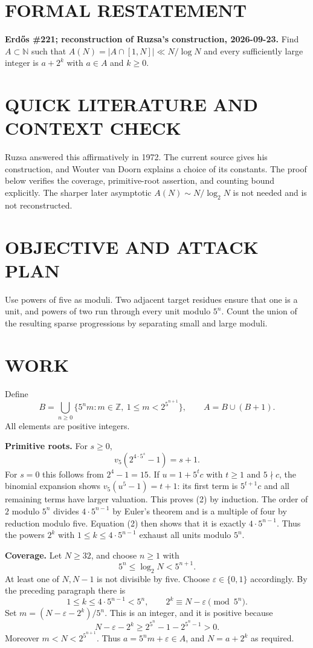 \section{FORMAL RESTATEMENT}
\textbf{Erd\H{o}s \#221; reconstruction of Ruzsa's construction, 2026-09-23.}
Find $A\subset\mathbb N$ such that $A(N)=|A\cap[1,N]|\ll N/\log N$ and every sufficiently large integer is $a+2^k$ with $a\in A$ and $k\geq0$.

\section{QUICK LITERATURE AND CONTEXT CHECK}
Ruzsa answered this affirmatively in 1972. The current source gives his construction, and Wouter van Doorn explains a choice of its constants. The proof below verifies the coverage, primitive-root assertion, and counting bound explicitly. The sharper later asymptotic $A(N)\sim N/\log_2N$ is not needed and is not reconstructed.

\section{OBJECTIVE AND ATTACK PLAN}
Use powers of five as moduli. Two adjacent target residues ensure that one is a unit, and powers of two run through every unit modulo $5^n$. Count the union of the resulting sparse progressions by separating small and large moduli.

\section{WORK}
Define
\[
B=\bigcup_{n\geq0}\{5^n m:m\in\mathbb Z,\ 1\leq m<2^{5^{n+1}}\},
\qquad A=B\cup(B+1).
\tag{1}
\]
All elements are positive integers.

\textbf{Primitive roots.} For $s\geq0$,
\[
v_5(2^{4\cdot5^s}-1)=s+1.
\tag{2}
\]
For $s=0$ this follows from $2^4-1=15$. If $u=1+5^t c$ with $t\geq1$ and $5\nmid c$, the binomial expansion shows $v_5(u^5-1)=t+1$: its first term is $5^{t+1}c$ and all remaining terms have larger valuation. This proves (2) by induction. The order of $2$ modulo $5^n$ divides $4\cdot5^{n-1}$ by Euler's theorem and is a multiple of four by reduction modulo five. Equation (2) then shows that it is exactly $4\cdot5^{n-1}$. Thus the powers $2^k$ with $1\leq k\leq4\cdot5^{n-1}$ exhaust all units modulo $5^n$.

\textbf{Coverage.} Let $N\geq32$, and choose $n\geq1$ with
\[
5^n\leq\log_2N<5^{n+1}.
\]
At least one of $N,N-1$ is not divisible by five. Choose $\varepsilon\in\{0,1\}$ accordingly. By the preceding paragraph there is
\[
1\leq k\leq4\cdot5^{n-1}<5^n,
\qquad 2^k\equiv N-\varepsilon\pmod{5^n}.
\]
Set $m=(N-\varepsilon-2^k)/5^n$. This is an integer, and it is positive because
\[
N-\varepsilon-2^k\geq2^{5^n}-1-2^{5^n-1}>0.
\]
Moreover $m<N<2^{5^{n+1}}$. Thus $a=5^n m+\varepsilon\in A$, and $N=a+2^k$ as required.

